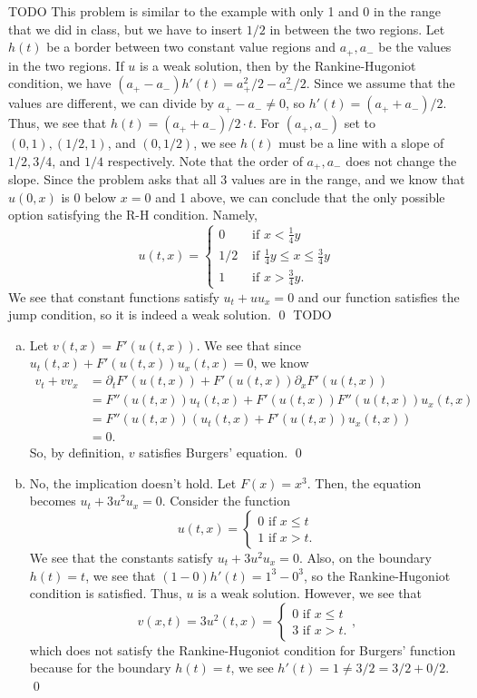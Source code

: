\documentclass{article}
\renewcommand{\d}{\partial}
\begin{document}
\newpage
{} TODO
\hop
\solution
This problem is similar to the example with only 1 and 0 in the range that we did in class, but we have to insert $1/2$ in between the two regions.
\hop 
Let $h(t)$ be a border between two constant value regions and $a_+, a_-$ be the values in the two regions. If $u$ is a weak solution, then by the Rankine-Hugoniot condition, we have $(a_+-a_-)h'(t) = a_+^2/2-a_-^2/2$. Since we assume that the values are different, we can divide by $a_+-a_- \ne 0$, so $h'(t) = (a_++a_-)/2$. Thus, we see that $h(t)= (a_++a_-)/2 \cdot t$. For $(a_+,a_-)$ set to $(0,1), (1/2, 1)$, and $(0, 1/2)$, we see $h(t)$ must be a line with a slope of $1/2, 3/4$, and $1/4$ respectively. Note that the order of $a_+,a_-$ does not change the slope. Since the problem asks that all 3 values are in the range, and we know that $u(0,x)$ is 0 below $x=0$ and 1 above, we can conclude that the only possible option satisfying the R-H condition. Namely, 
\[u(t,x)= \begin{cases}
    0 &\text{ if } x <  \frac{1}{4}y \\
    1/2 &\text{ if } \frac{1}{4}y \le x \le  \frac{3}{4}y \\
    1 &\text{ if }x > \frac{3}{4}y.
\end{cases}\]
We see that constant functions satisfy $u_t + uu_x=0$ and our function satisfies the jump condition, so it is indeed a weak solution. \qed
\newpage
{} TODO
\hop
\solution
\begin{enumerate}[(a)]
    \item Let $v(t,x) = F'(u(t,x))$. We see that since $u_t(t,x) + F'(u(t,x))u_x(t,x) = 0$, we know 
    \begin{align*}
        v_t + vv_x &= \d_tF'(u(t,x)) + F'(u(t,x))\d_xF'(u(t,x))\\
        &= F''(u(t,x))u_t(t,x) + F'(u(t,x))F''(u(t,x))u_x(t,x) \\
        &=F''(u(t,x))(u_t(t,x) + F'(u(t,x))u_x(t,x))\\
        &= 0.
    \end{align*}
    So, by definition, $v$ satisfies Burgers' equation. \qed
    \item No, the implication doesn't hold. Let $F(x) = x^3$. Then, the equation becomes $u_t + 3u^2u_x = 0$. Consider the function 
    \[u(t,x) = \begin{cases}
        0 \text{ if } x \le t \\
        1 \text{ if } x > t.
    \end{cases}\]
    We see that the constants satisfy $u_t + 3u^2u_x = 0$. Also, on the boundary $h(t) = t$, we see that $(1-0)h'(t) = 1^3 - 0^3$, so the Rankine-Hugoniot condition is satisfied. Thus, $u$ is a weak solution. However, we see that 
    \[v(x,t) = 3u^2(t,x) = \begin{cases}
        0 \text{ if } x \le t \\
        3 \text{ if } x > t.
    \end{cases},\]
    which does not satisfy the Rankine-Hugoniot condition for Burgers' function because for the boundary $h(t) = t$, we see $h'(t) = 1 \ne 3/2 = 3/2+0/2$. \qed 
\end{enumerate}
\end{document}
